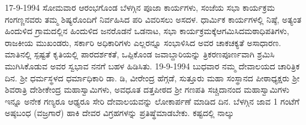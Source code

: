 17-9-1994 ಸೋಮವಾರ ಆರಂಭಗೊಂಡ ಬೆಳಗ್ಗಿನ ಪೂಜಾ ಕಾರ್ಯಗಳು, ಸಂಜೆಯ ಸಭಾ ಕಾರ್ಯಕ್ರಮ ಗಂಗಣ್ಣನವರು ತಮ್ಮ ಶಿಷ್ಯರೊಂದಿಗೆ ನಿರ್ವಹಿಸಿದ ಪರಿ ವಿವರಿಸಲು ಅಸದಳ. ಧಾರ್ಮಿಕ ಕಾರ್ಯಗಳಲ್ಲಿ ನಿಷ್ಠೆ, ಅತ್ಯಂತ ಹಿಂದುಳಿದ ಗ್ರಾಮದಲ್ಲಿನ ಹಿಂದುಳಿದ ಜನರೊಡನೆ ಒಡನಾಟ, ಸಭಾ ಕಾರ್ಯಕ್ರಮಕ್ಕೆಆಗಮಿಸಿದಮಠಾಧಿಪತಿಗಳು,                                                                                                                                                                                                                                                                                                                                                                                                                                                                                                                                                                                                                                                                                                                                                                                                                                                                                                                                                                                                                                                                                                                                                                                                                                                                                                                                                                                                                                                                                                                                                                                                                                                                                                                                                                                                                                                                                                                                                                                                                                                                                                                                                                                                                                                                                                                                                                                                                                                                                                                                                                                           ರಾಜಕೀಯ  ಮುಖಂಡರು,  ಸರ್ಕಾರಿ ಅಧಿಕಾರಿಗಳು ಎಲ್ಲರನ್ನೂ ಸಂಭಾಳಿಸಿದ ಅವರ ಚಾಕಚಕ್ಯತೆ ಅಸಾಧಾರಣ. ಮಾತಿನಲ್ಲಿ ಸ್ಪಷ್ಟತೆ ಕೃತಿಯಲ್ಲಿ ಪಾರದರ್ಶಕತೆ, ಒಪ್ಪಿಕೊಂಡ ಜವಾಬ್ದಾರಿಯನ್ನು ತ್ರಿಕರಣಪೂರ್ಣವಾಗಿ ಶ್ರಮಿಸಿ ಮುಗಿಸಿಕೊಡುವ ಅವರ ಸ್ವಭಾವ ನನಗೆ ಬಹಳ ಹಿಡಿಸಿತು. 19-9-1994 ಬುಧವಾರ ನಮ್ಮ ದೇವಾಲಯದ ಚಾರಿತ್ರಿಕ ದಿನ. ಶ್ರೀ ಧರ್ಮಸ್ಥಳದ ಧರ್ಮಾಧಿಕಾರಿ ಡಾ. ಡಿ, ವೀರೇಂದ್ರ ಹೆಗ್ಗಡೆ, ಸುತ್ತೂರು ಮಹಾ ಸಂಸ್ಥಾನದ ಪೀಠಾಧ್ಯಕ್ಷರು ಶ್ರೀ ಶಿವರಾತ್ರಿ ದೇಶೀಕೇಂದ್ರ ಮಹಾಸ್ವಾಮಿಗಳು, ಅವಧೂತ ದತ್ತಪೀಠದ ಶ್ರೀ ಗಣಪತಿ ಸಚ್ಚಿದಾನಂದ ಮಹಾಸ್ವಾಮಿಗಳು ಇನ್ನೂ ಅನೇಕ ಗಣ್ಯರೂ ಆಢ್ಯರೂ ಸೇರಿ ದೇವಾಲಯವನ್ನು ಲೋಕಾರ್ಪಣೆ ಮಾಡಿದ ದಿನ. ಬೆಳಗ್ಗಿನ ಜಾವ 1 ಗಂಟೆಗೆ ಅಷ್ಠಬಂಧ (ವಜ್ರಗಾರೆ) ಹಾಕಿ ದೇವರ ವಿಗ್ರಹಗಳನ್ನು ಪ್ರತಿಷ್ಥೆಮಾಡಬೇಕು. ಕಷ್ಟದಲ್ಲಿ ನಾಲ್ಕು 